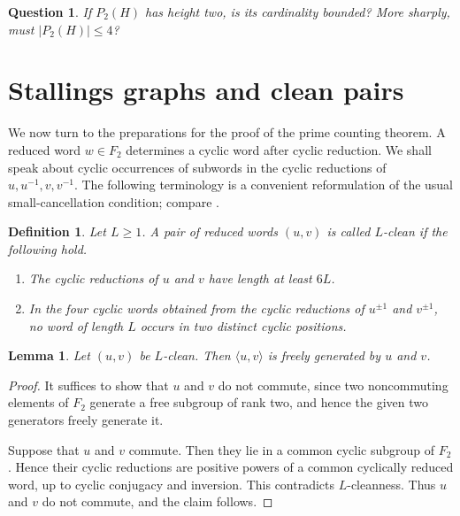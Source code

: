\documentclass{amsproc}
\newtheorem{lemma}[theorem]{Lemma}
\newtheorem{definition}[theorem]{Definition}
\newtheorem{question}[theorem]{Question}
\begin{document}
\begin{question}
\label{Q:lattice}
If $P_2(H)$ has height two, is its cardinality bounded?  More sharply, must
$|P_2(H)|\leq 4$?
\end{question}

\section{Stallings graphs and clean pairs}\label{S.clean}

We now turn to the preparations for the proof of the prime counting theorem.
A reduced word $w \in F_2$ determines a cyclic word after cyclic reduction.  We shall
speak about cyclic occurrences of subwords in the cyclic reductions of
$u,u^{-1},v,v^{-1}$.
The following terminology is a convenient reformulation of the usual
small-cancellation condition; compare \cite{LS}.

\begin{definition}
Let $L\geq 1$.  A pair of reduced words $(u,v)$ is called \emph{$L$-clean} if
the following hold.

\begin{enumerate}
\item The cyclic reductions of $u$ and $v$ have length at least $6L$.

\item In the four cyclic words obtained from the cyclic reductions of \(u^{\pm1}\) and \(v^{\pm1}\), no word of length \(L\) occurs in two distinct cyclic positions.
\end{enumerate}
\end{definition}

\begin{lemma}
Let $(u,v)$ be $L$-clean.  Then
$\langle u,v\rangle$ is freely generated by $u$ and $v$.
\end{lemma}

\begin{proof}
It suffices to show that \(u\) and \(v\) do not commute, since two
noncommuting elements of \(F_2\) generate a free subgroup of rank two, and hence
the given two generators freely generate it.

Suppose that \(u\) and \(v\) commute. Then they lie in a common cyclic subgroup
of \(F_2\). Hence their cyclic reductions are positive powers of a common cyclically reduced word, up to cyclic conjugacy and inversion. This contradicts \(L\)-cleanness. Thus \(u\) and \(v\) do not commute, and the claim follows.
\end{proof}
\end{document}
